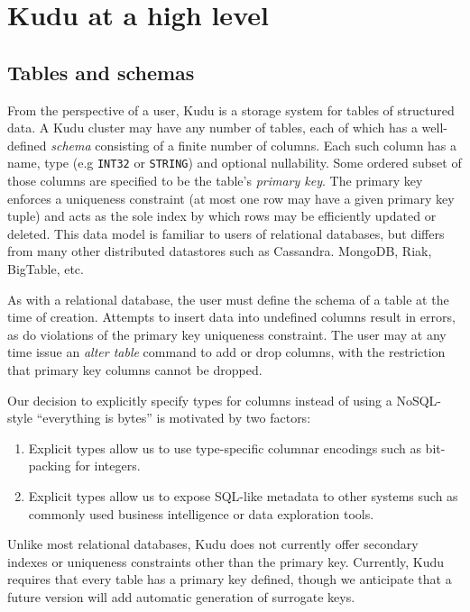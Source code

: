\documentclass{vldb}
\begin{document}
\section{Kudu at a high level}
\label{sec:high-level}

\subsection{Tables and schemas}
From the perspective of a user, Kudu is a storage system for tables of structured data.
A Kudu cluster may have any number of tables, each of which has a well-defined {\em schema}
consisting of a finite number of columns. Each such column has a name, type (e.g {\tt INT32}
or {\tt STRING}) and optional nullability. Some ordered subset of those columns
are specified to be the table's {\em primary key}. The primary key enforces a uniqueness constraint
(at most one row may have a given primary key tuple) and acts as the sole index by which
rows may be efficiently updated or deleted. This data model is familiar to users of relational
databases, but differs from many other distributed datastores such as Cassandra.
MongoDB\cite{mongodb}, Riak\cite{riak}, BigTable\cite{bigtable}, etc.

As with a relational database, the user must define the schema of a table at the time of creation.
Attempts to insert data into undefined columns result in errors, as do violations of the primary
key uniqueness constraint. The user may at any time issue an {\em alter table} command to add
or drop columns, with the restriction that primary key columns cannot be dropped.

Our decision to explicitly specify types for columns instead of using a NoSQL-style ``everything
is bytes'' is motivated by two factors:
\begin{enumerate}
\item Explicit types allow us to use type-specific columnar encodings such as bit-packing for
  integers.
\item Explicit types allow us to expose SQL-like metadata to other systems such as commonly used
  business intelligence or data exploration tools.
\end{enumerate}

Unlike most relational databases, Kudu does not currently offer secondary indexes or uniqueness constraints
other than the primary key. Currently, Kudu requires that every table has a primary key defined,
though we anticipate that a future version will add automatic generation of surrogate keys.
\end{document}
